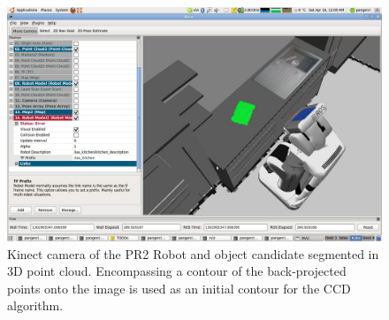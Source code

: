 \begin{figure}[htb]
  \centering
  \includegraphics[width=\linewidth]{images/pr2b.jpg}
  \caption[Kinect camera of the PR2 Robot and object candidate
  segmented in 3D point cloud.]{Kinect camera of
    the PR2 Robot and object candidate segmented in 3D point
    cloud. Encompassing a contour of the back-projected points onto
    the image is used as an initial contour for the CCD algorithm.}
  \label{fig:pointcloud}
\end{figure}



